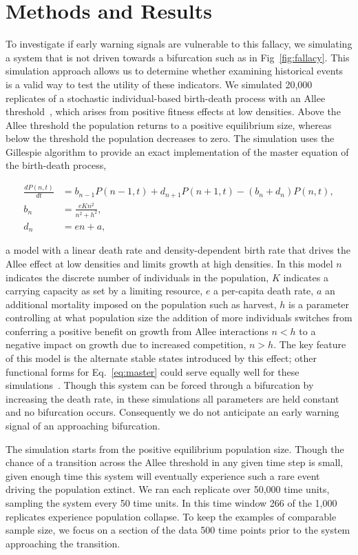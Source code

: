 \section{Methods and Results}
To investigate if early warning signals are vulnerable to this fallacy,
we simulating a system that is not driven towards a bifurcation such as
in Fig~\ref{fig:fallacy}.  This simulation approach allows us to determine whether
examining historical events is a valid way to test the utility of these
indicators.  We simulated 20,000 replicates of a stochastic individual-based
birth-death process with an Allee threshold~\citep{Courchamp2008}, which
arises from positive fitness effects at low densities.  Above the Allee
threshold the population returns to a positive equilibrium size, whereas
below the threshold the population decreases to zero. The
simulation uses the Gillespie algorithm to provide an exact implementation
of the master equation of the birth-death process,

\begin{align}
  \frac{dP(n,t)}{dt} &= b_{n-1} P(n-1,t) + d_{n+1}P(n+1,t) - (b_n+d_n) P(n,t)  \label{eq:master}, \\
    b_n &= \frac{e K n^2}{n^2 + h^2}, \\
    d_n &= e n + a,
\end{align}

a model with a linear death rate and density-dependent birth
rate that drives the Allee effect at low densities and limits
growth at high densities.  In this model $n$ indicates the discrete
number of individuals in the population, $K$ indicates a carrying 
capacity as set by a limiting resource, $e$ a per-capita death rate, 
$a$ an additional mortality imposed on the population such as harvest,
$h$ is a parameter controlling at what population size the addition of 
more individuals switches from conferring a positive benefit on growth 
from Allee interactions $n < h$ to a negative impact on growth due to 
increased competition, $n > h$.  The key feature of this model is the
alternate stable states introduced by this effect; other functional
forms for Eq.~\eqref{eq:master} could serve equally well for these
simulations~\citep[see \emph{e.g.}][]{Scheffer2001}.  Though this
system can be forced through a bifurcation by increasing
the death rate, in these simulations all parameters are held constant
and no bifurcation occurs.  Consequently we do not anticipate an early
warning signal of an approaching bifurcation.  

The simulation starts from the positive equilibrium population size.
Though the chance of a transition across the Allee threshold in any
given time step is small, given enough time this system will eventually
experience such a rare event driving the population extinct.  We ran
each replicate over 50,000 time units, sampling the system every 50
time units.  In this time window 266 of the 1,000 replicates experience
population collapse.  To keep the examples of comparable sample size,
we focus on a section of the data 500 time points prior to the system
approaching the transition.

